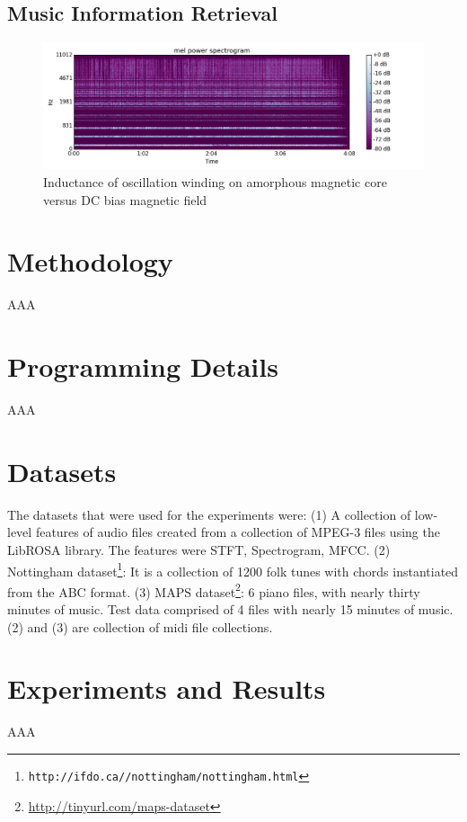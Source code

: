\documentclass[letterpaper, 10 pt, conference]{ieeeconf}
\begin{document}
\subsection{Music Information Retrieval}

\begin{figure}[thpb]
      \centering
      \includegraphics[scale=0.25]{mel_getlucky_3000_mels.png}
      \caption{Inductance of oscillation winding on amorphous
       magnetic core versus DC bias magnetic field}
      \label{figurelabel}
\end{figure}
\section{Methodology}
AAA

\section{Programming Details} 
AAA

\section{Datasets}
The datasets that were used for the experiments were: (1) A collection of low-level features of audio files created from a collection of MPEG-3 files using the LibROSA library\cite{c0}. The features were STFT, Spectrogram, MFCC. (2)  Nottingham dataset\footnote{\tt{http://ifdo.ca//nottingham/nottingham.html}}: It is a collection of 1200 folk tunes with chords instantiated from the ABC format. (3) MAPS dataset\footnote{\url{http://tinyurl.com/maps-dataset}}: 6 piano files, with nearly thirty minutes of music. Test data comprised of 4 files with nearly 15 minutes of music. (2) and (3) are collection of midi file collections.

\section{Experiments and Results}
AAA
\end{document}
